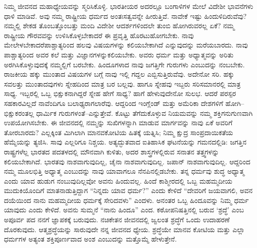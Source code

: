 ನಿಮ್ಮ ಜೀವನದ ಮಹಾಧ್ಯೇಯವನ್ನು ಸ್ಮರಿಸಿಕೊಳ್ಳಿ. ಭಾರತೀಯರ ಅದರಲ್ಲೂ ಬಂಗಾಳಿಗಳ ಮೇಲೆ ವಿದೇಶೀ ಭಾವನೆಗಳು ಧಾಳಿ ಮಾಡಿವೆ. ಅವು ನಮ್ಮ ರಾಷ್ಟ್ರೀಯ ಧರ್ಮದ ಅಂತಃಸತ್ವವನ್ನೇ ಹೀರುತ್ತಿವೆ. ನಾವೇಕೆ ಇಷ್ಟು ಹಿಂದುಳಿದಿರುವೆವು? ನಮ್ಮಲ್ಲಿ ಶೇಕಡ ತೊಂಬತ್ತೊಂಬತ್ತು ಮಂದಿ ವಿದೇಶೀ ಆದರ್ಶಗಳಿಂದಲೇ ತುಂಬಿ ಹೋಗಿರುವರಲ್ಲ ಏಕೆ? ನಮ್ಮ ರಾಷ್ಟ್ರೀಯ ಗೌರವವನ್ನು ಉಳಿಸಿಕೊಳ್ಳಬೇಕಾದರೆ ಈ ಪ್ರವೃತ್ತಿ ಹೊರಟುಹೋಗಬೇಕು. ನಾವು ಮೇಲೇಳಬೇಕಾದರೆ\break ಪಾಶ್ಚಾತ್ಯರಿಂದ ಹಲವು ವಿಷಯಗಳನ್ನು ಕಲಿಯಬೇಕಾಗಿದೆ ಎನ್ನುವುದನ್ನು ಮರೆಯಬಾರದು. ನಾವು ಪಾಶ್ಚಾತ್ಯರಿಂದ ಅವರ ಕಲೆ ಮತ್ತು ವಿಜ್ಞಾನಗಳನ್ನು\break ಕಲಿಯಬೇಕು. ಅವರು ಧರ್ಮ ಮತ್ತು ಅಧ್ಯಾತ್ಮವನ್ನು ಅರಿತು ಅರಗಿಸಿಕೊಳ್ಳುವುದಕ್ಕೆ ನಮ್ಮಲ್ಲಿಗೆ ಬರಬೇಕು. ಹಿಂದೂಗಳಾದ ನಾವು ಜಗತ್ತಿಗೇ ಗುರುಗಳು ಎಂಬುದನ್ನು ನಂಬಬೇಕು. ರಾಜಕೀಯ ಹಕ್ಕು ಮುಂತಾದ ವಿಷಯಗಳ ಬಗ್ಗೆ ನಾವು ಇಲ್ಲಿ ಗದ್ದಲ ಎಬ್ಬಿಸುತ್ತಿರುವೆವು. ಅದೇನೋ ಸರಿ. ಹಕ್ಕು ಸವಲತ್ತು ಮುಂತಾದವುಗಳು ಸ್ನೇಹದಿಂದ ಮಾತ್ರ ಬರ ಬಲ್ಲವು. ಹಾಗೂ ಸ್ನೇಹವು ಇಬ್ಬರು ಸರಿಸಮಾನರಲ್ಲಿ ಮಾತ್ರ ಸಾಧ್ಯ. ಇಬ್ಬರಲ್ಲಿ ಒಬ್ಬ ಭಿಕ್ಷುಕನಾಗಿದ್ದರೆ ಸ್ನೇಹ ಹೇಗೆ ಸಾಧ್ಯ? ಹಾಗೆ ಹೇಳುವುದೇನೋ ಸುಲಭ. ಆದರೆ ಪರಸ್ಪರ ಸಹಕಾರವಿಲ್ಲದೆ ನಾವೆಂದಿಗೂ ಬಲಾಢ್ಯರಾಗಲಾರೆವು. ಆದ್ದರಿಂದ ಇಂಗ್ಲೆಂಡ್​ ಮತ್ತು ಅಮೆರಿಕಾ ದೇಶಗಳಿಗೆ ಹೋಗಿ–ಭಿಕ್ಷುಕರಂತಲ್ಲ ಧಾರ್ಮಿಕ ಗುರುಗಳಂತೆ–ಎನ್ನುತ್ತೇವೆ. ಕೊಟ್ಟು ತೆಗೆದುಕೊಳ್ಳುವ ನಿಯಮವನ್ನು ನಮ್ಮ ಶಕ್ತಿಗನುಗುಣವಾಗಿ ಉಪಯೋಗಿಸಬೇಕು. ಈ ಜೀವನದಲ್ಲಿ ನಮ್ಮನ್ನು ಸುಖಿಗಳನ್ನಾಗಿ ಮಾಡುವ ಮಾರ್ಗವನ್ನು ನಾವು ಏಕೆ ಅವರಿಗೆ ತೋರಬಾರದು? ಎಲ್ಲಕ್ಕಿಂತ ಮಿಗಿಲಾಗಿ ಮಾನವಕೋಟಿಯ ಹಿತಕ್ಕೆ ಯತ್ನಿಸಿ; ನಿಮ್ಮ ಕ್ಷುದ್ರ ಸಾಂಪ್ರದಾಯಿಕತೆಯ ಹೆಮ್ಮೆಯನ್ನು ತ್ಯಜಿಸಿ. ಸಾವು ಎಲ್ಲರಿಗೂ ನಿಶ್ಚಯ. ಅತ್ಯದ್ಭುತವಾದ ಐತಿಹಾಸಿಕ ಘಟನೆಯನ್ನು ಗಮನದಲ್ಲಿಡಿ: ಜಗತ್ತಿನ ರಾಷ್ಟ್ರಗಳೆಲ್ಲ ಭಾರತದ ಪದತಳದಲ್ಲಿ ಮೌನವಾಗಿ ಕುಳಿತು, ಅದರ ಶಾಸ್ತ್ರಗಳಲ್ಲಿರುವ ಸನಾತನ ತತ್ತ್ವಗಳನ್ನು ಕಲಿಯಬೇಕಾಗಿದೆ. ಭಾರತವು ನಾಶವಾಗುವುದಿಲ್ಲ, ಚೈನಾ ನಾಶವಾಗುವುದಿಲ್ಲ. ಜಪಾನ್​ ನಾಶವಾಗುವುದಿಲ್ಲ. ಆದ್ದರಿಂದ ನಮ್ಮ ಮೂಲಭಿತ್ತಿ ಅಧ್ಯಾತ್ಮ ಎಂಬುದನ್ನು ನಾವು ಯಾವಾಗಲೂ ನೆನಪಿನಲ್ಲಿಡಬೇಕು. ತನ್ನ ಧರ್ಮವು ಶುದ್ಧ ಅಧ್ಯಾತ್ಮ ಎಂದು ಯಾವ ಹುಡುಗ ನಂಬುವುದಿಲ್ಲವೋ ಅವನು ಹಿಂದುವಲ್ಲ. ಹಿಂದೆ ಕಾಶ್ಮೀರದಲ್ಲಿ ಒಬ್ಬ ಮಹಮ್ಮದೀಯ ಮುದುಕಿಯೊಂದಿಗೆ ಮಾತನಾಡುತ್ತಿದ್ದಾಗ “ನಿನ್ನದು ಯಾವ ಧರ್ಮ?” ಎಂದು ಕೇಳಿದೆ “ದೇವರಿಗೆ ಜಯವಾಗಲಿ, ಅವನ ದಯೆಯಿಂದ ನಾನು ಮಹಮ್ಮದೀಯ ಧರ್ಮಕ್ಕೆ ಸೇರಿದವಳು” ಎಂದಳು. ಅನಂತರ ಒಬ್ಬ ಹಿಂದೂವನ್ನು ನಿಮ್ಮ ಧರ್ಮ ಯಾವುದು ಎಂದು ಕೇಳಿದೆ. ಅವನು ಸುಮ್ಮನೆ “ನಾನು ಹಿಂದೂ” ಎಂದ. ಕಠೋಪನಿಷತ್ತಿನಲ್ಲಿ ಬರುವ ‘ಶ್ರದ್ಧೆ’ ಎಂಬ ಅಪೂರ್ವ ಪದ ನನಗೆ ಜ್ಞಾಪಕಕ್ಕೆ ಬರುವುದು. ನಚಿಕೇತನ ಜೀವನದಲ್ಲಿ ಜ್ವಲಂತ ಶ್ರದ್ಧೆಗೆ ಒಂದು ಉದಾಹರಣೆ ದೊರಕುವುದು. ಆತ್ಮಶ್ರದ್ಧೆಯನ್ನು ಸಾರುವುದೇ ನನ್ನ ಜೀವನದ ಧ್ಯೇಯ. ಶ್ರದ್ಧೆಯೇ ಮಾನವ ಕೋಟಿಯ ಮತ್ತು ಎಲ್ಲಾ ಧರ್ಮಗಳ ಅತ್ಯಂತ ಶಕ್ತಿಪೂರ್ಣವಾದ ಅಂಶ ಎಂಬುದನ್ನು ಮತ್ತೊಮ್ಮೆ ಹೇಳುತ್ತೇನೆ. 

